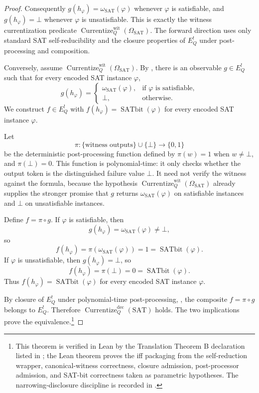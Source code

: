 \documentclass[11pt]{article}
\newcommand{\EQbang}{E^{!}_{Q}}
\newcommand{\OmegaSAT}{\Omega_{\mathrm{SAT}}}
\newcommand{\SATbit}{\operatorname{SATbit}}
\newcommand{\omegaSATsel}{\omega_{\mathrm{SAT}}}
\newcommand{\CurrentizeDec}{\operatorname{Currentize}^{\mathrm{dec}}_{Q}}
\newcommand{\CurrentizeWit}{\operatorname{Currentize}^{\mathrm{wit}}_{Q}}
\theoremstyle{definition}
\begin{document}
\begin{proof}
Consequently \(g(h_{\varphi})=\omegaSATsel(\varphi)\) whenever
\(\varphi\) is satisfiable, and \(g(h_{\varphi})=\bot\) whenever
\(\varphi\) is unsatisfiable.  This is exactly the witness
currentization predicate \(\CurrentizeWit(\OmegaSAT)\).  The forward
direction uses only standard SAT self-reducibility and the closure
properties of \(\EQbang\) under post-processing and composition.

Conversely, assume \(\CurrentizeWit(\OmegaSAT)\).  By
, there is an observable
\(g\in\EQbang\) such that for every encoded SAT instance
\(\varphi\),
\[
  g(h_{\varphi})=
  \begin{cases}
    \omegaSATsel(\varphi),
      & \text{if } \varphi \text{ is satisfiable},\\
    \bot,
      & \text{otherwise}.
  \end{cases}
\]
We construct \(f\in\EQbang\) with
\(f(h_{\varphi})=\SATbit(\varphi)\) for every encoded SAT instance
\(\varphi\).

Let
\[
  \pi:\{\text{witness outputs}\}\cup\{\bot\}\longrightarrow\{0,1\}
\]
be the deterministic post-processing function defined by
\(\pi(w)=1\) when \(w\neq\bot\), and \(\pi(\bot)=0\).  This function
is polynomial-time: it only checks whether the output token is the
distinguished failure value \(\bot\).  It need not verify the witness
against the formula, because the hypothesis
\(\CurrentizeWit(\OmegaSAT)\) already supplies the stronger promise
that \(g\) returns \(\omegaSATsel(\varphi)\) on satisfiable instances
and \(\bot\) on unsatisfiable instances.

Define \(f=\pi\circ g\).  If \(\varphi\) is satisfiable, then
\[
  g(h_{\varphi})=\omegaSATsel(\varphi)\neq\bot,
\]
so
\[
  f(h_{\varphi})
  =
  \pi(\omegaSATsel(\varphi))
  =
  1
  =
  \SATbit(\varphi).
\]
If \(\varphi\) is unsatisfiable, then \(g(h_{\varphi})=\bot\), so
\[
  f(h_{\varphi})
  =
  \pi(\bot)
  =
  0
  =
  \SATbit(\varphi).
\]
Thus \(f(h_{\varphi})=\SATbit(\varphi)\) for every encoded SAT
instance \(\varphi\).

By closure of \(\EQbang\) under polynomial-time post-processing,
, the composite
\(f=\pi\circ g\) belongs to \(\EQbang\).  Therefore
\(\CurrentizeDec(\mathrm{SAT})\) holds.  The two implications prove
the equivalence.\footnote{This theorem is verified in Lean by the
Translation Theorem B
declaration listed in ; the Lean theorem proves
the iff packaging from the self-reduction wrapper, canonical-witness
correctness, closure admission, post-processor admission, and SAT-bit
correctness taken as parametric hypotheses.  The narrowing-disclosure
discipline is recorded in
.}
\end{proof}
 
\end{document}
